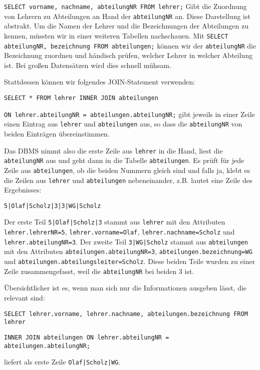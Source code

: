 \lstinline!SELECT vorname, nachname, abteilungNR FROM lehrer;!
Gibt die Zuordnung von Lehrern zu Abteilungen an Hand der \lstinline!abteilungNR! an. Diese Darstellung ist abstrakt. Um die Namen der Lehrer und die Bezeichnungen der Abteilungen zu kennen, müssten wir in einer weiteren Tabellen nachschauen. Mit \lstinline!SELECT abteilungNR, bezeichnung FROM abteilungen;! können wir der \lstinline!abteilungNR! die Bezeichnung zuordnen und händisch prüfen, welcher Lehrer in welcher Abteilung ist. Bei großen Datensätzen wird dies schnell mühsam.

Stattdessen können wir folgendes JOIN-Statement verwenden:

\lstinline!SELECT * FROM lehrer INNER JOIN abteilungen!

\lstinline!ON lehrer.abteilungNR = abteilungen.abteilungNR;!
gibt jeweils in einer Zeile einen Eintrag aus \lstinline!lehrer! und \lstinline!abteilungen! aus, so dass die \lstinline!abteilungNR! von beiden Einträgen übereinstimmen.

Das DBMS nimmt also die erste Zeile aus \lstinline!lehrer! in die Hand, liest die \lstinline!abteilungNR! aus und geht dann in die Tabelle \lstinline!abteilungen!. Es prüft für jede Zeile aus \lstinline!abteilungen!, ob die beiden Nummern gleich sind und falls ja, klebt es die Zeilen aus \lstinline!lehrer! und \lstinline!abteilungen! nebeneinander, z.B. lautet eine Zeile des Ergebnisses:

\lstinline!5|Olaf|Scholz|3|3|WG|Scholz!

Der erste Teil \lstinline!5|Olaf|Scholz|3! stammt aus \lstinline!lehrer! mit den Attributen \lstinline!lehrer.lehrerNR=5!, \lstinline!lehrer.vorname=Olaf!, \lstinline!lehrer.nachname=Scholz! und \lstinline!lehrer.abteilungNR=3!. Der zweite Teil \lstinline!3|WG|Scholz! stammt aus \lstinline!abteilungen! mit den Attributen \lstinline!abteilungen.abteilungNR=3!, \lstinline!abteilungen.bezeichnung=WG! und \lstinline!abteilungen.abteilungsleiter=Scholz!. Diese beiden Teile wurden zu einer Zeile zusammengefasst, weil die \lstinline!abteilungNR! bei beiden 3 ist.

Übersichtlicher ist es, wenn man sich nur die Informationen ausgeben lässt, die relevant sind:

\lstinline!SELECT lehrer.vorname, lehrer.nachname, abteilungen.bezeichnung FROM lehrer!

\lstinline!INNER JOIN abteilungen ON lehrer.abteilungNR = abteilungen.abteilungNR;!

liefert als erste Zeile \lstinline!Olaf|Scholz|WG!.

